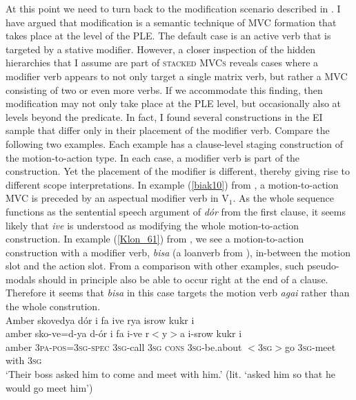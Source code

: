 At this point we need to turn back to the modification scenario described in . I have argued that modification is a semantic technique of MVC formation that takes place at the level of the PLE. The default case is an active verb that is targeted by a stative modifier. However, a closer inspection of the hidden hierarchies that I assume are part of \textsc{stacked MVCs} reveals cases where a modifier verb appears to not only target a single matrix verb, but rather a MVC consisting of two or even more verbs. If we accommodate this finding, then modification may not only take place at the PLE level, but occasionally also at levels beyond the predicate. In fact, I found several constructions in the EI sample that differ only in their placement of the modifier verb. Compare the following two examples. Each example has a clause-level staging construction of the motion-to-action type. In each case, a modifier verb is part of the construction. Yet the placement of the modifier is different, thereby giving rise to different scope interpretations. In example (\ref{biak10}) from , a motion-to-action MVC is preceded by an aspectual modifier verb in V$_1$. As the whole sequence functions as the sentential speech argument of \textit{dór} from the first clause, it seems likely that \textit{ive} is understood as modifying the whole motion-to-action construction. In example (\ref{Klon_61}) from , we see a motion-to-action construction with a modifier verb, \textit{bisa} (a loanverb from ), in-between the motion slot and the action slot. From a comparison with other  examples, such pseudo-modals should in principle also be able to occur right at the end of a clause. Therefore it seems that \textit{bisa} in this case targets the motion verb \textit{agai} rather than the whole constrution.
\ea \label{biak10}
\\
\glll Amber skovedya dór i fa ive rya isrow kukr i \\
amber sko-ve=d-ya d-ór i fa i-ve r$<$y$>$a i-srow kukr i \\
amber 3\textsc{pa}-\textsc{pos}=3\textsc{sg}-\textsc{spec} 3\textsc{sg}-call 3\textsc{sg} \textsc{cons} 3\textsc{sg}-be.about $<$3\textsc{sg}$>$go 3\textsc{sg}-meet with 3\textsc{sg}\\
\glft `Their boss asked him to come and meet with him.' (lit. `asked him so that he
would go meet him') \\ 
\z


